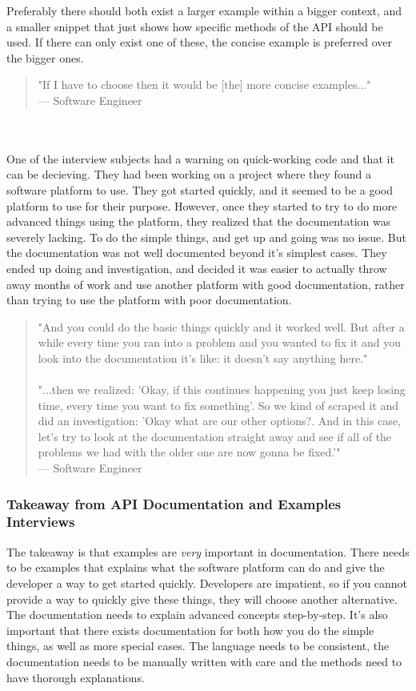 \documentclass{cslthse-msc}
\begin{document}
    Preferably there should both exist a larger example within a bigger context, and a smaller snippet that just shows how specific methods of the API should be used. If there can only exist one of these, the concise example is preferred over the bigger ones.
    \begin{quote}
        "If I have to choose then it would be [the] more concise examples..."\\
        --- Software Engineer
    \end{quote}
    \\ \\
    One of the interview subjects had a warning on quick-working code and that it can be decieving. They had been working on a project where they found a software platform to use. They got started quickly, and it seemed to be a good platform to use for their purpose. However, once they started to try to do more advanced things using the platform, they realized that the documentation was severely lacking. To do the simple things, and get up and going was no issue. But the documentation was not well documented beyond it's simplest cases. They ended up doing and investigation, and decided it was easier to actually throw away months of work and use another platform with good documentation, rather than trying to use the platform with poor documentation.
    \begin{quote}
        "And you could do the basic things quickly and it worked well. But after a while every time you ran into a problem and you wanted to fix it and you look into the documentation it's like: it doesn't say anything here." \\ \\
        "...then we realized: 'Okay, if this continues happening you just keep losing time, every time you want to fix something'. So we kind of scraped it and did an investigation: 'Okay what are our other options?. And in this case, let's try to look at the documentation straight away and see if all of the problems we had with the older one are now gonna be fixed.'" \\
        --- Software Engineer
    \end{quote}
    \subsubsection{Takeaway from API Documentation and Examples Interviews}
    The takeaway is that examples are \textit{very} important in documentation. There needs to be examples that explains what the software platform can do and give the developer a way to get started quickly. Developers are impatient, so if you cannot provide a way to quickly give these things, they will choose another alternative. The documentation needs to explain advanced concepts step-by-step. It's also important that there exists documentation for both how you do the simple things, as well as more special cases. The language needs to be consistent, the documentation needs to be manually written with care and the methods need to have thorough explanations.
\end{document}
